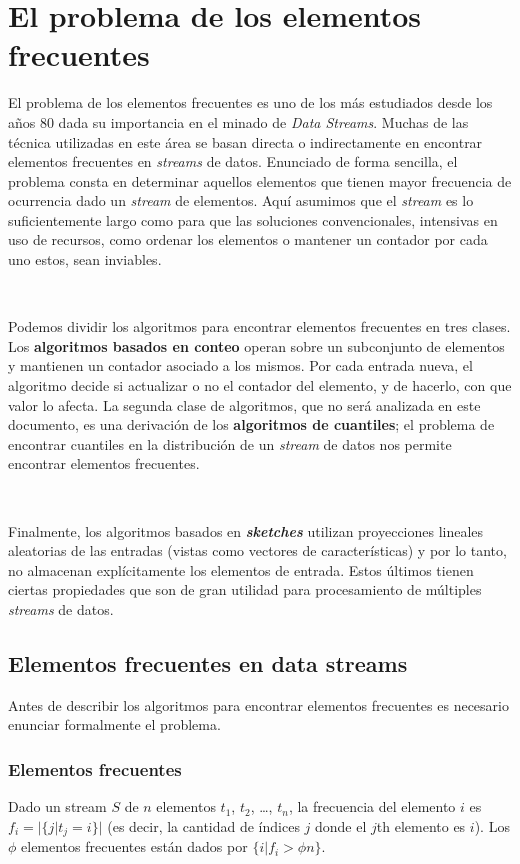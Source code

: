 \documentclass[a4paper,12pt, oneside]{article}
\begin{document}
\newpage

\section{El problema de los elementos frecuentes}
El problema de los elementos frecuentes es uno de los más estudiados desde los años 80 dada su importancia en el minado de \textit{Data Streams}. Muchas de las técnica utilizadas en este área se basan directa o indirectamente en encontrar elementos frecuentes en \textit{streams} de datos. Enunciado de forma sencilla, el problema consta en determinar aquellos elementos que tienen mayor frecuencia de ocurrencia dado un \textit{stream} de elementos. Aquí asumimos que el \textit{stream} es lo suficientemente largo como para que las soluciones convencionales, intensivas en uso de recursos, como ordenar los elementos o mantener un contador por cada uno estos, sean inviables.
 
\

Podemos dividir los algoritmos para encontrar elementos frecuentes en tres clases. Los \textbf{algoritmos basados en conteo} operan sobre un subconjunto de elementos y mantienen un contador asociado a los mismos. Por cada entrada nueva, el algoritmo decide si actualizar o no el contador del elemento, y de hacerlo, con que valor lo afecta. 
La segunda clase de algoritmos, que no será analizada en este documento, es una derivación de los \textbf{algoritmos de cuantiles}; el problema de encontrar cuantiles en la distribución de un \textit{stream} de datos nos permite encontrar elementos frecuentes.

\

Finalmente, los algoritmos basados en \textbf{\textit{sketches}} utilizan proyecciones lineales aleatorias de las entradas\cite{Cormode:2008:FFI:1454159.1454225} (vistas como vectores de características) y por lo tanto, no almacenan explícitamente los elementos de entrada. Estos últimos tienen ciertas propiedades que son de gran utilidad para procesamiento de múltiples \textit{streams} de datos.

\subsection{Elementos frecuentes en data streams}\label{elementos_frecuentes_en_datastreams}
Antes de describir los algoritmos para encontrar elementos frecuentes es necesario enunciar formalmente el problema.

\subsubsection{Elementos frecuentes}\label{elementos_frecuentes} Dado un stream $S$ de $n$ elementos $t_1$, $t_2$, \dots, $t_n$, la frecuencia del elemento $i$ es $f_i = |\{j|t_j=i\}|$ (es decir, la cantidad de índices $j$ donde el $j$th elemento es $i$). Los $\phi$ elementos frecuentes están dados por $\{i|f_i>\phi n\}$.
\end{document}
